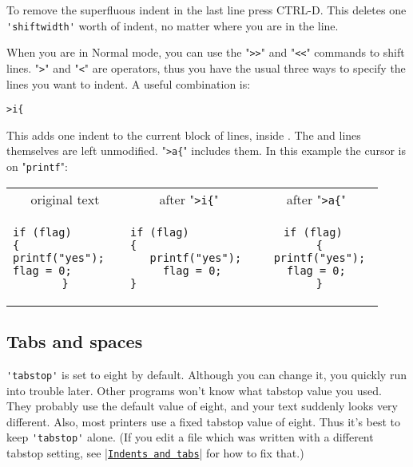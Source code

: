 To remove the superfluous indent in the last line press CTRL-D.
This deletes one \verb!'shiftwidth'! worth of indent, no matter where you are in the line.

When you are in Normal mode, you can use the "\verb!>>!" and "\verb!<<!" commands to shift lines.
"\verb!>!" and "\verb!<!" are operators, thus you have the usual three ways to specify the lines you want to indent.
A useful combination is:

\begin{Verbatim}[samepage=true]
 >i{
\end{Verbatim}

This adds one indent to the current block of lines, inside {}.
The { and } lines themselves are left unmodified.
"\verb!>a{!" includes them.
In this example the cursor is on "\verb!printf!":

\begin{center} \begin{tabular}{|c|c|c|}
				\hline
				original text & after "\verb!>i{!" & after "\verb!>a{!" \\ 
				\begin{minipage}{4cm}
				\begin{verbatim}
if (flag)       
{               
printf("yes");  
flag = 0;       
}
				\end{verbatim}
				\end{minipage}
& 
				\begin{minipage}{4cm}
				\begin{verbatim}
if (flag)         
{                 
  printf("yes");
  flag = 0; 
}                 
				\end{verbatim}
				\end{minipage}
&
				\begin{minipage}{4cm}
				\begin{verbatim}
if (flag) 
  { 
  printf("yes"); 
  flag = 0;  
  } 
				\end{verbatim}
				\end{minipage} \\
				\hline
\end{tabular} \end{center}
\subsection{Tabs and spaces}
\verb!'tabstop'! is set to eight by default.
Although you can change it, you quickly run into trouble later.
Other programs won't know what tabstop value you used.
They probably use the default value of eight, and your text suddenly looks very different.
Also, most printers use a fixed tabstop value of eight.
Thus it's best to keep \verb!'tabstop'! alone.
(If you edit a file which was written with a different tabstop setting, see |\hyperref[Indents and tabs]{\texttt{Indents and tabs}}| for how to fix that.)

